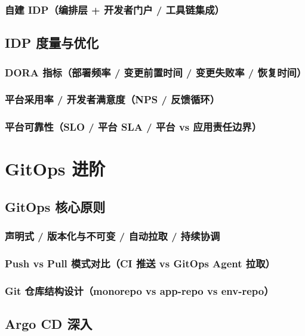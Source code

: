 \documentclass[12pt,UTF8]{ctexbook}
\begin{document}
    \subsection{自建 IDP（编排层 + 开发者门户 / 工具链集成）}

  \section{IDP 度量与优化}
    \subsection{DORA 指标（部署频率 / 变更前置时间 / 变更失败率 / 恢复时间）}
    \subsection{平台采用率 / 开发者满意度（NPS / 反馈循环）}
    \subsection{平台可靠性（SLO / 平台 SLA / 平台 vs 应用责任边界）}


\chapter{GitOps 进阶}
\label{chap:gitops-advanced}

  \section{GitOps 核心原则}
    \subsection{声明式 / 版本化与不可变 / 自动拉取 / 持续协调}
    \subsection{Push vs Pull 模式对比（CI 推送 vs GitOps Agent 拉取）}
    \subsection{Git 仓库结构设计（monorepo vs app-repo vs env-repo）}

  \section{Argo CD 深入}
\end{document}
